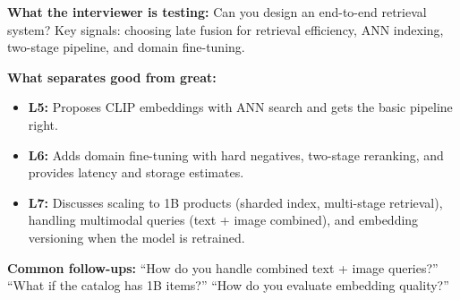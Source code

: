 \begin{interviewq}
\textbf{What the interviewer is testing:} Can you design an end-to-end retrieval system? Key signals: choosing late fusion for retrieval efficiency, ANN indexing, two-stage pipeline, and domain fine-tuning.

\textbf{What separates good from great:}
\begin{itemize}
    \item \textbf{L5:} Proposes CLIP embeddings with ANN search and gets the basic pipeline right.
    \item \textbf{L6:} Adds domain fine-tuning with hard negatives, two-stage reranking, and provides latency and storage estimates.
    \item \textbf{L7:} Discusses scaling to 1B products (sharded index, multi-stage retrieval), handling multimodal queries (text + image combined), and embedding versioning when the model is retrained.
\end{itemize}

\textbf{Common follow-ups:} ``How do you handle combined text + image queries?'' ``What if the catalog has 1B items?'' ``How do you evaluate embedding quality?''
\end{interviewq}


